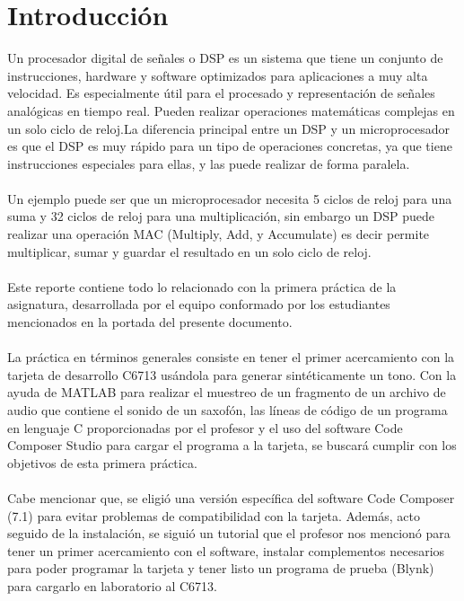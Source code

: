\documentclass[12pt]{article}
\begin{document}

\newpage

\section{Introducción}

Un procesador digital de señales o DSP  es un sistema que tiene un conjunto de instrucciones,
 hardware y software optimizados para aplicaciones  a muy alta velocidad. Es especialmente útil para el procesado y 
representación de señales analógicas en tiempo real. Pueden
realizar operaciones matemáticas complejas en un solo ciclo de reloj.La diferencia principal entre un DSP y
un microprocesador es que
el DSP es muy rápido para un tipo de operaciones concretas, ya que tiene instrucciones especiales para ellas, y las puede
realizar de forma paralela.
\\\\
Un ejemplo puede ser que un microprocesador  necesita 5
ciclos de reloj para una suma y 32 ciclos
de reloj para una multiplicación, sin embargo un DSP puede realizar una operación MAC (Multiply, Add, y
Accumulate) es decir permite multiplicar, sumar y guardar el resultado en un solo
ciclo de reloj.
\\
\\
Este reporte contiene todo lo relacionado con la primera práctica de la asignatura, desarrollada por el equipo conformado por los estudiantes mencionados en la portada del presente documento.
\\
\\
La práctica en términos generales consiste en tener el primer acercamiento con la tarjeta de desarrollo C6713 usándola para generar sintéticamente un tono. Con la ayuda de MATLAB para realizar el muestreo de un fragmento de un archivo de audio que contiene el sonido de un saxofón, las líneas de código de un programa en lenguaje C proporcionadas por el profesor y el uso del software Code Composer Studio para cargar el programa a la tarjeta, se buscará cumplir con los objetivos de esta primera práctica.
\\
\\
Cabe mencionar que, se eligió una versión específica del software Code Composer (7.1) para evitar problemas de compatibilidad con la tarjeta. Además, acto seguido de la instalación, se siguió un tutorial que el profesor nos mencionó para tener un primer acercamiento con el software, instalar complementos necesarios para poder programar la tarjeta y tener listo un programa de prueba (Blynk) para cargarlo en laboratorio al C6713.
\end{document}
